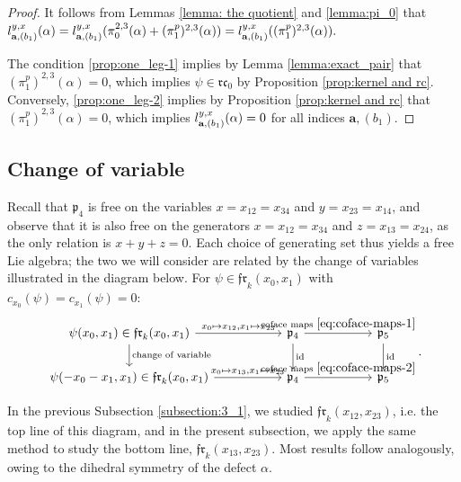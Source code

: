 \documentclass[a4paper,fleqn]{cas-sc}
\DeclareMathOperator{\id}{id}
\begin{document}
\begin{proof}
It follows from Lemmas \ref{lemma: the quotient} and \ref{lemma:pi_0} that
$
l^{y,x}_{\bold a,(b_1)}(\alpha)=l^{y,x}_{\bold a,(b_1)}(\pi^{2,3}_0(\alpha)+(\pi_1^p)^{2,3}(\alpha))=l^{y,x}_{\bold a,(b_1)}((\pi^p_1)^{2,3}(\alpha)).
$

The condition \eqref{prop:one_leg-1} implies by Lemma \ref{lemma:exact_pair} that $(\pi^p_1)^{2,3}(\alpha)=0$, which implies $\psi\in \mathfrak{rc}_0$ by Proposition \ref{prop:kernel and rc}. Conversely, \eqref{prop:one_leg-2} implies by Proposition \ref{prop:kernel and rc} that $(\pi^p_1)^{2,3}(\alpha)=0$, which implies $l^{y,x}_{\bold a, (b_1)}(\alpha)=0$ for all indices $\textbf{a},(b_1)$.
\end{proof}

\subsection{Change of variable} \label{subsection:3_2}
Recall that $\mathfrak{p}_4$ is free on the variables $x=x_{12}=x_{34}$ and $y=x_{23}=x_{14}$, and observe that it is also free on the generators $x=x_{12}=x_{34}$ and $z=x_{13}=x_{24}$, as the only relation is $x+y+z=0$. Each choice of generating set thus yields a free Lie algebra; the two we will consider are related by the change of variables illustrated in the diagram below. For $\psi \in \mathfrak{fr}_k(x_0,x_1)$ with $c_{x_0}(\psi)=c_{x_1}(\psi)=0$:
$$
\begin{tikzcd}
	\psi(x_0,x_1)\in\mathfrak{fr}_k(x_0,x_1)\arrow{r}{x_0\mapsto x_{12},x_1\mapsto x_{23}}\arrow{d}{\text{change of variable}}&[3em]\mathfrak{p}_4\arrow{d}{\id}\arrow{r}{\text{coface maps } \eqref{eq:coface-maps-1}}&[3em]\mathfrak{p}_5\arrow{d}{\id}\\
	\psi(-x_0-x_1,x_1)\in\mathfrak{fr}_k( x_0,x_1)\arrow{r}{x_0\mapsto x_{13},x_1\mapsto x_{23}}&\mathfrak{p}_4\arrow{r}{\text{coface maps } \eqref{eq:coface-maps-2}}&\mathfrak{p}_5
\end{tikzcd}.
$$


In the previous Subsection \ref{subsection:3_1}, we studied $\mathfrak{fr}_k(x_{12},x_{23})$, i.e. the top line of this diagram, and in the present subsection, we apply the same method to study the bottom line, $\mathfrak{fr}_k(x_{13},x_{23})$. Most results follow analogously, owing to the dihedral symmetry of the defect $\alpha$.\\
\end{document}
